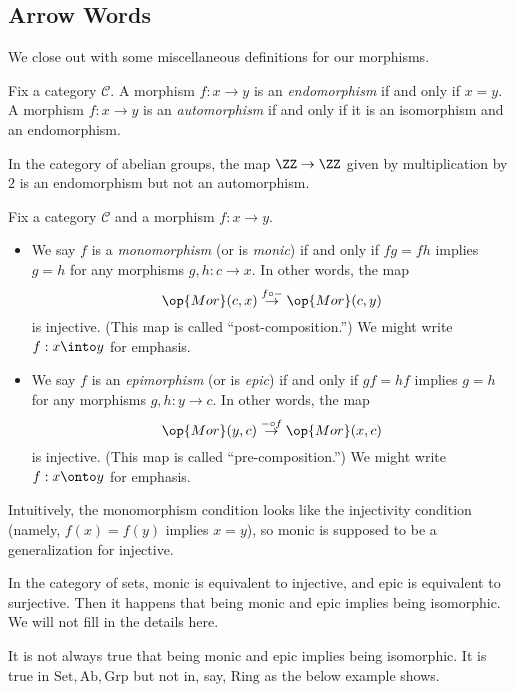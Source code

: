 \documentclass[../notes.tex]{subfiles}
\begin{document}
\subsection{Arrow Words}
We close out with some miscellaneous definitions for our morphisms.
\begin{definition}
	Fix a category $\mathcal C$. A morphism $f:x\to y$ is an \textit{endomorphism} if and only if $x=y$. A morphism $f:x\to y$ is an \textit{automorphism} if and only if it is an isomorphism and an endomorphism.
\end{definition}
\begin{example}
	In the category of abelian groups, the map $\ZZ\to\ZZ$ given by multiplication by $2$ is an endomorphism but not an automorphism.
\end{example}
\begin{definition}
	Fix a category $\mathcal C$ and a morphism $f:x\to y$.
	\begin{itemize}
		\item We say $f$ is a \textit{monomorphism} (or is \textit{monic}) if and only if $fg=fh$ implies $g=h$ for any morphisms $g,h:c\to x$. In other words, the map
		\[\op{Mor}(c,x)\stackrel{f\circ-}\to\op{Mor}(c,y)\]
		is injective. (This map is called ``post-composition.'') We might write $f:x\into y$ for emphasis.
		\item We say $f$ is an \textit{epimorphism} (or is \textit{epic}) if and only if $gf=hf$ implies $g=h$ for any morphisms $g,h:y\to c$. In other words, the map
		\[\op{Mor}(y,c)\stackrel{-\circ f}\to\op{Mor}(x,c)\]
		is injective. (This map is called ``pre-composition.'') We might write $f:x\onto y$ for emphasis.
	\end{itemize}
\end{definition}
Intuitively, the monomorphism condition looks like the injectivity condition (namely, $f(x)=f(y)$ implies $x=y$), so monic is supposed to be a generalization for injective.
\begin{example}
	In the category of sets, monic is equivalent to injective, and epic is equivalent to surjective. Then it happens that being monic and epic implies being isomorphic. We will not fill in the details here.
\end{example}
\begin{warn}
	It is not always true that being monic and epic implies being isomorphic. It is true in $\mathrm{Set},\mathrm{Ab},\mathrm{Grp}$ but not in, say, $\mathrm{Ring}$ as the below example shows.
\end{warn}
\end{document}
